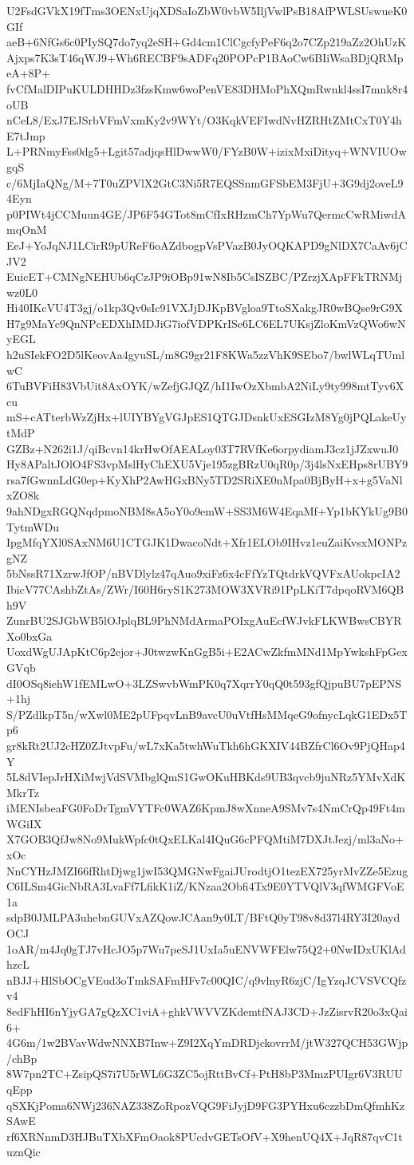 U2FsdGVkX19fTms3OENxUjqXDSaIoZbW0vbW5IljVwlPsB18AfPWLSUswueK0GIf
aeB+6NfGs6c0PIySQ7do7yq2eSH+Gd4cm1ClCgcfyPeF6q2o7CZp219aZz2OhUzK
Ajxps7K3sT46qWJ9+Wh6RECBF9sADFq20POPcP1BAoCw6BIiWsaBDjQRMpeA+8P+
fvCfMalDIPuKULDHHDz3fzsKmw6woPenVE83DHMoPhXQmRwnkl4ssI7mnk8r4oUB
nCeL8/ExJ7EJSrbVFmVxmKy2v9WYt/O3KqkVEFIwdNvHZRHtZMtCxT0Y4hE7tJmp
L+PRNmyFss0dg5+Lgit57adjqsHlDwwW0/FYzB0W+izixMxiDityq+WNVIUOwgqS
c/6MjIaQNg/M+7T0uZPVlX2GtC3Ni5R7EQSSnmGFSbEM3FjU+3G9dj2oveL94Eyn
p0PIWt4jCCMuun4GE/JP6F54GTot8mCfIxRHzmCh7YpWu7QermcCwRMiwdAmqOnM
EeJ+YoJqNJ1LCirR9pUReF6oAZdbogpVsPVazB0JyOQKAPD9gNlDX7CaAv6jCJV2
EuicET+CMNgNEHUb6qCzJP9iOBp91wN8Ib5CsISZBC/PZrzjXApFFkTRNMjwz0L0
Hi40IKcVU4T3gj/o1kp3Qv0sIc91VXJjDJKpBVgloa9TtoSXakgJR0wBQse9rG9X
H7g9MaYc9QnNPcEDXhIMDJiG7iofVDPKrISe6LC6EL7UKsjZloKmVzQWo6wNyEGL
h2uSIekFO2D5lKeovAa4gyuSL/m8G9gr21F8KWa5zzVhK9SEbo7/bwlWLqTUmlwC
6TuBVFiH83VbUit8AxOYK/wZefjGJQZ/hI1IwOzXbmbA2NiLy9ty998mtTyv6Xcu
mS+cATterbWzZjHx+lUIYBYgVGJpES1QTGJDsnkUxESGIzM8Yg0jPQLakeUytMdP
GZBz+N262i1J/qiBcvn14krHwOfAEALoy03T7RVfKe6orpydiamJ3cz1jJZxwuJ0
Hy8APaltJOlO4FS3vpMslHyChEXU5Vje195zgBRzU0qR0p/3j4lsNxEHps8rUBY9
rsa7fGwnnLdG0ep+KyXhP2AwHGxBNy5TD2SRiXE0nMpa0BjByH+x+g5VaNlxZO8k
9ahNDgxRGQNqdpmoNBM8sA5oY0o9emW+SS3M6W4EqaMf+Yp1bKYkUg9B0TytmWDu
IpgMfqYXl0SAxNM6U1CTGJK1DwacoNdt+Xfr1ELOb9IHvz1euZaiKvsxMONPzgNZ
5bNssR71XzrwJfOP/nBVDlylz47qAuo9xiFz6x4cFfYzTQtdrkVQVFxAUokpcIA2
IbicV77CAshbZtAs/ZWr/I60H6ryS1K273MOW3XVRi91PpLKiT7dpqoRVM6QBh9V
ZunrBU2SJGbWB5lOJplqBL9PhNMdArmaPOIxgAuEcfWJvkFLKWBwsCBYRXo0bxGa
UoxdWgUJApKtC6p2ejor+J0twzwKnGgB5i+E2ACwZkfmMNd1MpYwkshFpGexGVqb
dI0OSq8iehW1fEMLwO+3LZSwvbWmPK0q7XqrrY0qQ0t593gfQjpuBU7pEPNS+1hj
S/PZdlkpT5n/wXwl0ME2pUFpqvLnB9avcU0uVtfHsMMqeG9ofnycLqkG1EDx5Tp6
gr8kRt2UJ2cHZ0ZJtvpFu/wL7xKa5twhWuTkh6hGKXIV44BZfrCl6Ov9PjQHap4Y
5L8dVIepJrHXiMwjVdSVMbglQmS1GwOKuHBKds9UB3qvcb9juNRz5YMvXdKMkrTz
iMENIsbeaFG0FoDrTgmVYTFc0WAZ6KpmJ8wXnneA9SMv7s4NmCrQp49Ft4mWGiIX
X7GOB3QfJw8No9MukWpfc0tQxELKal4IQuG6cPFQMtiM7DXJtJezj/ml3aNo+xOc
NnCYHzJMZI66fRhtDjwg1jwI53QMGNwFgaiJUrodtjO1tezEX725yrMvZZe5Ezug
C6ILSm4GicNbRA3LvaFf7LfikK1iZ/KNzaa2Obfi4Tx9E0YTVQlV3qfWMGFVoE1a
sdpB0JMLPA3uhebnGUVxAZQowJCAan9y0LT/BFtQ0yT98v8d37l4RY3I20aydOCJ
1oAR/m4Jq0gTJ7vHcJO5p7Wu7peSJ1UxIa5uENVWFElw75Q2+0NwIDxUKlAdhzcL
nBJJ+HlSbOCgVEud3oTmkSAFmHFv7c00QIC/q9vlnyR6zjC/IgYzqJCVSVCQfzv4
8edFhHI6nYjyGA7gQzXC1viA+ghkVWVVZKdemtfNAJ3CD+JzZisrvR20o3xQai6+
4G6m/1w2BVavWdwNNXB7Inw+Z9I2XqYmDRDjckovrrM/jtW327QCH53GWjp/chBp
8W7pn2TC+ZsipQS7i7U5rWL6G3ZC5ojRttBvCf+PtH8bP3MmzPUIgr6V3RUUqEpp
qSXKjPoma6NWj236NAZ338ZoRpozVQG9FiJyjD9FG3PYHxu6czzbDmQfmhKzSAwE
rf6XRNnmD3HJBuTXbXFmOaok8PUcdvGETsOfV+X9henUQ4X+JqR87qvC1tuznQic
